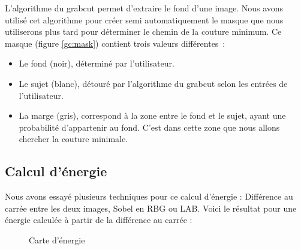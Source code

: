 \documentclass[a4paper]{article}
\begin{document}
L'algorithme du grabcut permet d'extraire le fond d'une image. 
Nous avons utilisé cet algorithme pour créer semi automatiquement le masque que nous utiliserons plus tard
pour déterminer le chemin de la couture minimum. 
Ce masque (figure \ref{gc:mask}) contient trois valeurs différentes~:

\begin{itemize}
    \item Le fond (noir), déterminé par l'utilisateur. 
    \item Le sujet (blanc), détouré par l'algorithme du grabcut selon les entrées de l'utilisateur.
    \item La marge (gris), correspond à la zone entre le fond et le sujet, ayant une probabilité d'appartenir au fond. C'est dans cette zone que nous allons chercher la couture minimale.
\end{itemize}

\subsection{Calcul d'énergie}

Nous avons essayé plusieurs techniques pour ce calcul d'énergie : Différence au carrée entre les deux images, Sobel en RBG ou LAB.
Voici le résultat pour une énergie calculée à partir de la différence au carrée :
\begin{figure}[!ht]%
    \centering
    \hspace{0.030\textwidth}
    \caption{Carte d'énergie}
    \label{energie}
\end{figure}
\end{document}
